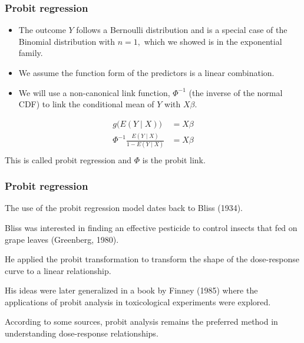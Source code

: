\documentclass{beamer}
\begin{document}
\begin{frame}
\frametitle{Probit regression}



\begin{itemize}
\item The outcome $Y$ follows a Bernoulli distribution and is a special case of the Binomial distribution with $n=1,$ which we showed is in the exponential family.
\item We assume the function form of the predictors is a linear combination. 
\item We will use a non-canonical link function, $\Phi^{-1}$ (the inverse of the normal CDF) to link the conditional mean of $Y$ with $X\beta.$
\end{itemize}

\begin{align}
g \Big( E(Y \mid X) \Big) &= X \beta \\
\Phi^{-1}\frac{E(Y \mid X)}{1 - E(Y \mid X)} &= X\beta \\
\end{align}
This is called probit regression and $\Phi$ is the probit link.



\end{frame}

\begin{frame}
\frametitle{Probit regression}

The use of the probit regression model
dates back to Bliss (1934). 

\vspace*{1em}

Bliss was interested
in finding an effective pesticide to control
insects that fed on grape leaves (Greenberg,
1980). 

\vspace*{1em}


He applied the probit transformation to transform
the shape of the dose-response curve to a
linear relationship. 

\vspace*{1em}

His ideas were later
generalized in a book by Finney (1985) where
the applications of probit analysis in
toxicological experiments were explored.

\vspace*{1em}

According to some sources, probit analysis
remains the preferred method in understanding
dose-response relationships. 



\end{frame}
\end{document}
